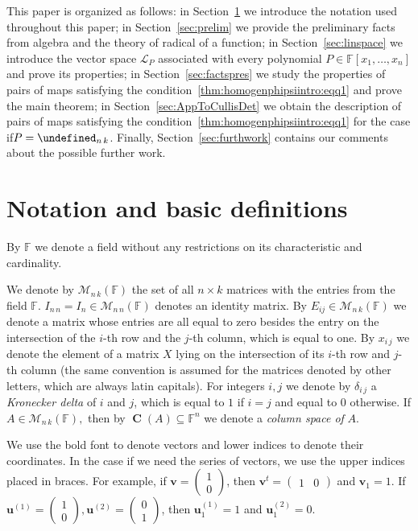\documentclass{elsarticle}
\let\det\undefined
\DeclareMathOperator{\det}{det}
\DeclareMathOperator{\colsp}{\mathbf C}
\def\F{{\mathbb F}}
\def\M{{\mathcal M}}
\theoremstyle{definition}
\numberwithin{equation}{section}
\begin{document}
This paper is organized as follows: in Section~\ref{sec:notation} we introduce the notation used throughout this paper; in Section~\ref{sec:prelim} we provide the preliminary facts from algebra and the theory of radical of a function; in Section~\ref{sec:linspace} we introduce the vector space $\mathcal L_P$ associated with every polynomial $P \in \F[x_1,\ldots, x_n]$ and prove its properties; in Section~\ref{sec:factspres} we study the properties of pairs of maps satisfying the condition~\eqref{thm:homogenphipsiintro:eqq1} and prove the main theorem; in Section~\ref{sec:AppToCullisDet} we obtain the description of pairs of maps satisfying the condition~\eqref{thm:homogenphipsiintro:eqq1} for the case if\linebreak $P = \det_{n\,k}$. Finally, Section~\ref{sec:furthwork} contains our comments about the possible further work.

\section{Notation and basic definitions}
\label{sec:notation}
By $\F$ we denote a field without any restrictions on its characteristic and cardinality. 

We denote by $\M_{n\, k}(\F)$ the set of all $n\times k$ matrices with the entries from the field $\F.$ %
$I_{n\, n} = I_{n} \in \M_{n\, n}(\F)$ denotes an identity matrix. By $E_{ij} \in \M_{n\, k}(\mathbb F)$ we denote a matrix whose entries are all equal to zero besides the entry on the intersection of the $i$-th row and the $j$-th column, which is equal to one. By $x_{i\, j}$ we denote the element of a matrix $X$ lying on the intersection of its $i$-th row and $j$-th column (the same convention is assumed for the matrices denoted by other letters, which are always latin capitals).  For integers $i, j$ we denote by $\delta_{i\,j}$  a \emph{Kronecker delta} of $i$ and $j$, which is equal to $1$ if $i = j$ and equal to $0$ otherwise. If $A \in \M_{n\,k}(\F),$ then by  $\colsp (A) \subseteq \F^n$ we denote a \emph{column space of} $A$.

We use the bold font to denote vectors and lower indices to denote their coordinates. In the case if we need the series of vectors, we use the upper indices placed in braces. For example, if $\mathbf v = \begin{pmatrix}1 \\ 0\end{pmatrix}$, then $\mathbf v^t = \begin{pmatrix}1 & 0\end{pmatrix}$ and $\mathbf v_1 = 1$. If $\mathbf u^{(1)} = \begin{pmatrix}1 \\ 0\end{pmatrix}, \mathbf u^{(2)} =  \begin{pmatrix}0 \\ 1\end{pmatrix}$, then $\mathbf u^{(1)}_1 = 1$ and $\mathbf u^{(2)}_1 = 0$.  
\end{document}
